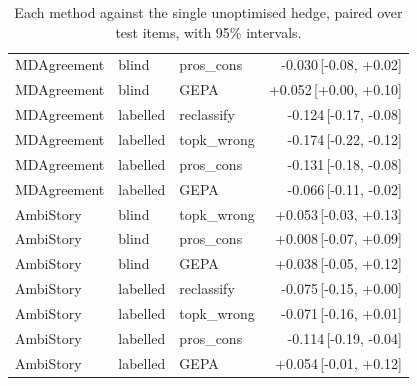 \begin{table}[t]
\begin{tabular}{lllr}
MDAgreement & blind & pros\_cons & -0.030{\scriptsize\,[-0.08, +0.02]} \\
MDAgreement & blind & GEPA & +0.052{\scriptsize\,[+0.00, +0.10]} \\
MDAgreement & labelled & reclassify & -0.124{\scriptsize\,[-0.17, -0.08]} \\
MDAgreement & labelled & topk\_wrong & -0.174{\scriptsize\,[-0.22, -0.12]} \\
MDAgreement & labelled & pros\_cons & -0.131{\scriptsize\,[-0.18, -0.08]} \\
MDAgreement & labelled & GEPA & -0.066{\scriptsize\,[-0.11, -0.02]} \\
AmbiStory & blind & topk\_wrong & +0.053{\scriptsize\,[-0.03, +0.13]} \\
AmbiStory & blind & pros\_cons & +0.008{\scriptsize\,[-0.07, +0.09]} \\
AmbiStory & blind & GEPA & +0.038{\scriptsize\,[-0.05, +0.12]} \\
AmbiStory & labelled & reclassify & -0.075{\scriptsize\,[-0.15, +0.00]} \\
AmbiStory & labelled & topk\_wrong & -0.071{\scriptsize\,[-0.16, +0.01]} \\
AmbiStory & labelled & pros\_cons & -0.114{\scriptsize\,[-0.19, -0.04]} \\
AmbiStory & labelled & GEPA & +0.054{\scriptsize\,[-0.01, +0.12]} \\
\hline
\end{tabular}
\caption{Each method against the single unoptimised hedge, paired over test items, with 95\% intervals.}
\label{tab:paired-methods}
\end{table}